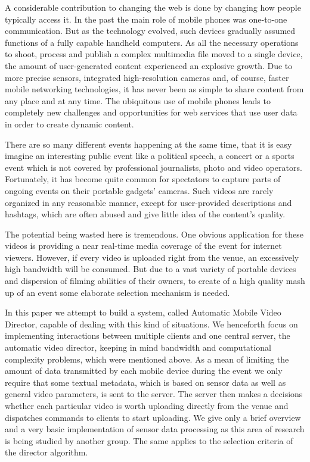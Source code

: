 \documentclass[conference]{IEEEtran}
\begin{document}
A considerable contribution to changing the web is done by changing how people typically access it.
In the past the main role of mobile phones was one-to-one communication. 
But as the technology evolved, such devices gradually assumed functions of a fully capable handheld computers.
As all the necessary operations to shoot, process and publish a complex multimedia file moved to a single device, 
the amount of user-generated content experienced an explosive growth.
Due to more precise sensors, integrated high-resolution cameras and, of course, faster mobile networking technologies, 
it has never been as simple to share content from any place and at any time.
The ubiquitous use of mobile phones leads to completely new challenges and opportunities for web services 
that use user data in order to create dynamic content.

There are so many different events happening at the same time, 
that it is easy imagine an interesting public event like a political speech, 
a concert or a sports event which is not covered by professional journalists, photo and video operators.
Fortunately, it has become quite common for spectators to capture parts of ongoing events on their portable gadgets' cameras.
Such videos are rarely organized in any reasonable manner, except for user-provided descriptions and hashtags, 
which are often abused and give little idea of the content's quality.

The potential being wasted here is tremendous. 
One obvious application for these videos is providing a near real-time media coverage of the event for internet viewers.
However, if every video is uploaded right from the venue, an excessively high bandwidth will be consumed.
But due to a vast variety of portable devices and dispersion of filming abilities of their owners,
to create of a high quality mash up of an event some elaborate selection mechanism is needed.

In this paper we attempt to build a system, called Automatic Mobile Video Director, capable of dealing with this kind of situations.
We henceforth focus on implementing interactions between multiple clients and one central server, the automatic video director,
keeping in mind bandwidth and computational complexity problems, which were mentioned above. 
As a mean of limiting the amount of data transmitted by each mobile device during the event we only require 
that some textual metadata, which is based on sensor data as well as general video parameters, is sent to the server.
The server then makes a decisions whether each particular video is worth uploading directly from the venue
and dispatches commands to clients to start uploading.
We give only a brief overview and a very basic implementation of sensor data processing as this area of research 
is being studied by another group. The same applies to the selection criteria of the director algorithm.
\end{document}
